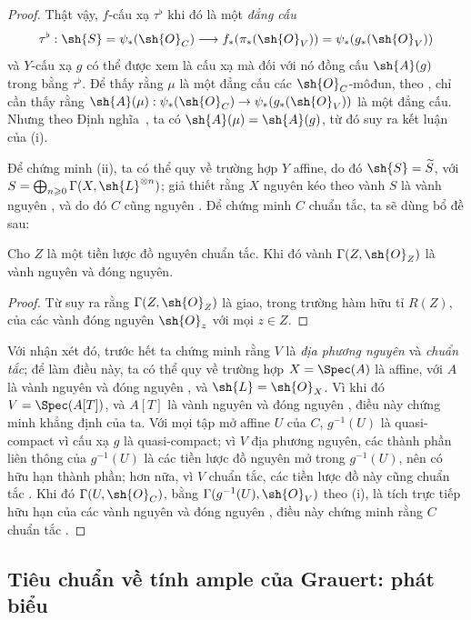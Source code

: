 \documentclass[oneside,10pt]{amsart}
\makeatletter
\renewcommand{\geq}{\geqslant}
\newcommand{\ega@arrow}[2]{\mathchoice{#1}{#2}{#2}{#2}}
\renewcommand{\to}{\ega@arrow{\longrightarrow}{\rightarrow}}
\newcommand{\oldpage}[2][]{\marginnote{\normalfont\footnotesize\textbf{#1}~|~#2}\ignorespaces}
\let\EGAOriginalLabel\label
\renewcommand{\label}[1]{\phantomsection\EGAOriginalLabel{#1}}
\makeatother
\begin{document}
\begin{proof}
Thật vậy, $f$-cấu xạ $\tau^\flat$ khi đó là một \emph{đẳng cấu}
\[
  \tau^\flat:\sh{S}=\psi_*(\sh{O}_C)\to f_*(\pi_*(\sh{O}_V))=\psi_*(g_*(\sh{O}_V))
\]
và $Y$-cấu xạ $g$ có thể được xem là cấu xạ mà đối với nó đồng cấu $\sh{A}(g)$ trong  bằng $\tau^\flat$.
Để thấy rằng $\mu$ là một đẳng cấu các $\sh{O}_C$-môđun, theo , chỉ cần thấy rằng $\sh{A}(\mu):\psi_*(\sh{O}_C)\to\psi_*(g_*(\sh{O}_V))$ là một đẳng cấu.
Nhưng theo Định nghĩa~, ta có $\sh{A}(\mu)=\sh{A}(g)$, từ đó suy ra kết luận của (i).

Để chứng minh (ii), ta có thể quy về trường hợp $Y$ affine, do đó $\sh{S}=\widetilde{S}$, với
\oldpage[II]{182}
$S=\bigoplus_{n\geq0}\Gamma(X,\sh{L}^{\otimes n})$;
giả thiết rằng $X$ nguyên kéo theo vành $S$ là vành nguyên , và do đó $C$ cũng nguyên .
Để chứng minh $C$ chuẩn tắc, ta sẽ dùng bổ đề sau:

\begin{lemma}[8.8.6.1]
\label{II.8.8.6.1}
Cho $Z$ là một tiền lược đồ nguyên chuẩn tắc.
Khi đó vành $\Gamma(Z,\sh{O}_Z)$ là vành nguyên và đóng nguyên.
\end{lemma}

\begin{proof}
Từ  suy ra rằng $\Gamma(Z,\sh{O}_Z)$ là giao, trong trường hàm hữu tỉ $R(Z)$, của các vành đóng nguyên $\sh{O}_z$ với mọi $z\in Z$.
\end{proof}

Với nhận xét đó, trước hết ta chứng minh rằng $V$ là \emph{địa phương nguyên} và \emph{chuẩn tắc};
để làm điều này, ta có thể quy về trường hợp $X=\Spec(A)$ là affine, với $A$ là vành nguyên và đóng nguyên , và $\sh{L}=\sh{O}_X$.
Vì khi đó $V=\Spec(A[T])$, và $A[T]$ là vành nguyên và đóng nguyên \cite[p.~99]{II-24}, điều này chứng minh khẳng định của ta.
Với mọi tập mở affine $U$ của $C$, $g^{-1}(U)$ là quasi-compact vì cấu xạ $g$ là quasi-compact;
vì $V$ địa phương nguyên, các thành phần liên thông của $g^{-1}(U)$ là các tiền lược đồ nguyên mở trong $g^{-1}(U)$, nên có hữu hạn thành phần; hơn nữa, vì $V$ chuẩn tắc, các tiền lược đồ này cũng chuẩn tắc .
Khi đó $\Gamma(U,\sh{O}_C)$, bằng $\Gamma(g^{-1}(U),\sh{O}_V)$ theo (i), là tích trực tiếp hữu hạn của các vành nguyên và đóng nguyên , điều này chứng minh rằng $C$ chuẩn tắc .
\end{proof}
\subsection{Tiêu chuẩn về tính ample của Grauert: phát biểu}
\label{subsection:II.8.9}
\end{document}
